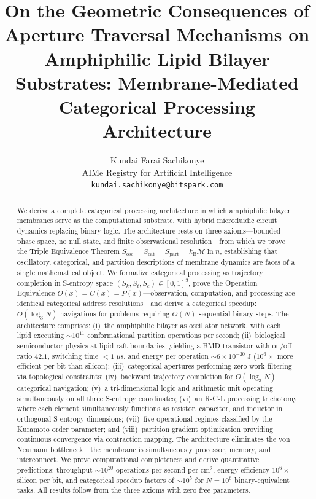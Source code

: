 \documentclass[twocolumn,10pt]{article}
\title{\textbf{On the Geometric Consequences of Aperture Traversal Mechanisms on Amphiphilic Lipid Bilayer Substrates: Membrane-Mediated Categorical Processing Architecture}}
\author{
Kundai Farai Sachikonye\\
AIMe Registry for Artificial Intelligence\\
\texttt{kundai.sachikonye@bitspark.com}
}
\date{}
\theoremstyle{remark}
\newcommand{\kB}{k_{\mathrm{B}}}
\newcommand{\Depth}{\mathcal{M}}
\newcommand{\Sk}{S_k}
\newcommand{\St}{S_t}
\newcommand{\Se}{S_e}
\newcommand{\Sosc}{S_{\mathrm{osc}}}
\newcommand{\Scat}{S_{\mathrm{cat}}}
\newcommand{\Spart}{S_{\mathrm{part}}}
\begin{document}
\maketitle

\begin{abstract}
\noindent We derive a complete categorical processing architecture in which amphiphilic bilayer membranes serve as the computational substrate, with hybrid microfluidic circuit dynamics replacing binary logic. The architecture rests on three axioms---bounded phase space, no null state, and finite observational resolution---from which we prove the Triple Equivalence Theorem $\Sosc = \Scat = \Spart = \kB \Depth \ln n$, establishing that oscillatory, categorical, and partition descriptions of membrane dynamics are faces of a single mathematical object. We formalize categorical processing as trajectory completion in S-entropy space $(\Sk, \St, \Se) \in [0,1]^3$, prove the Operation Equivalence $O(x) = C(x) = P(x)$---observation, computation, and processing are identical categorical address resolutions---and derive a categorical speedup: $O(\log_3 N)$ navigations for problems requiring $O(N)$ sequential binary steps. The architecture comprises: (i)~the amphiphilic bilayer as oscillator network, with each lipid executing $\sim 10^{11}$ conformational partition operations per second; (ii)~biological semiconductor physics at lipid raft boundaries, yielding a BMD transistor with on/off ratio $42.1$, switching time $< 1\;\mu\mathrm{s}$, and energy per operation $\sim 6 \times 10^{-20}\;\mathrm{J}$ ($10^6\times$ more efficient per bit than silicon); (iii)~categorical apertures performing zero-work filtering via topological constraints; (iv)~backward trajectory completion for $O(\log_3 N)$ categorical navigation; (v)~a tri-dimensional logic and arithmetic unit operating simultaneously on all three S-entropy coordinates; (vi)~an R-C-L processing trichotomy where each element simultaneously functions as resistor, capacitor, and inductor in orthogonal S-entropy dimensions; (vii)~five operational regimes classified by the Kuramoto order parameter; and (viii)~partition gradient optimization providing continuous convergence via contraction mapping. The architecture eliminates the von Neumann bottleneck---the membrane is simultaneously processor, memory, and interconnect. We prove computational completeness and derive quantitative predictions: throughput $\sim 10^{20}$ operations per second per $\mathrm{cm}^2$, energy efficiency $10^6\times$ silicon per bit, and categorical speedup factors of $\sim 10^5$ for $N = 10^6$ binary-equivalent tasks. All results follow from the three axioms with zero free parameters.
\end{abstract}
\end{document}
